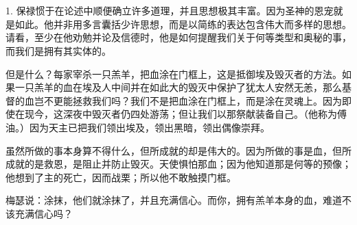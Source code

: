 

\section{}


\subsection{}

\par

1. 保禄惯于在论述中顺便确立许多道理，并且思想极其丰富。因为圣神的恩宠就是如此。他并非用多言囊括少许思想，而是以简练的表达包含伟大而多样的思想。请看，至少在他劝勉并论及信德时，他是如何提醒我们关于何等类型和奥秘的事，而我们是拥有其实体的。\par

但是什么？每家宰杀一只羔羊，把血涂在门框上，这是抵御埃及毁灭者的方法。如果一只羔羊的血在埃及人中间并在如此大的毁灭中保护了犹太人安然无恙，那么基督的血岂不更能拯救我们吗？我们不是把血涂在门框上，而是涂在灵魂上。因为即使在现今，这深夜中毁灭者仍四处游荡；但让我们以那祭献装备自己。（他称为傅油。）因为天主已把我们领出埃及，领出黑暗，领出偶像崇拜。\par

虽然所做的事本身算不得什么，但所成就的却是伟大的。因为所做的事是血，但所成就的是救恩，是阻止并防止毁灭。天使惧怕那血；因为他知道那是何等的预像；他想到了主的死亡，因而战栗；所以他不敢触摸门框。\par

梅瑟说：涂抹，他们就涂抹了，并且充满信心。而你，拥有羔羊本身的血，难道不该充满信心吗？\par

